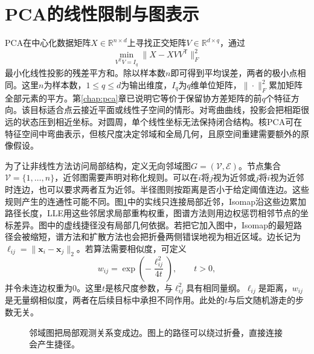 \section{PCA的线性限制与图表示}
PCA在中心化数据矩阵$X\in\mathbb R^{n\times d}$上寻找正交矩阵$V\in\mathbb R^{d\times q}$，通过
\begin{equation}
 \min_{V^{\mathsf T}V=I_q}\|X-XVV^{\mathsf T}\|_F^2
 \label{eq:manifold-pca-baseline}
\end{equation}
最小化线性投影的残差平方和。除以样本数$n$即可得到平均误差，两者的极小点相同。这里$n$为样本数，$1\leq q\leq d$为输出维度，$I_q$为$q$维单位矩阵，$\|\cdot\|_F^2$累加矩阵全部元素的平方。第\ref{chap:pca}章已说明它等价于保留协方差矩阵的前$q$个特征方向。该目标适合点云接近平面或线性子空间的情形。对弯曲曲线，投影会把相距很远的状态压到相近坐标。对圆周，单个线性坐标无法保持闭合结构。核PCA可在特征空间中弯曲表示，但核尺度决定邻域和全局几何，且原空间重建需要额外的原像假设\cite{scholkopf1998kpca}。

为了让非线性方法访问局部结构，定义无向邻域图$G=(\mathcal V,\mathcal E)$。节点集合$\mathcal V=\{1,\ldots,n\}$，近邻图需要声明对称化规则。可以在$i$将$j$视为近邻或$j$将$i$视为近邻时连边，也可以要求两者互为近邻。半径图则按距离是否小于给定阈值连边。这些规则产生的连通性可能不同。图\ref{fig:manifold-neighborhood-graph}中的实线只连接局部近邻，Isomap沿这些边累加路径长度，LLE用这些邻居求局部重构权重，图谱方法则用边权惩罚相邻节点的坐标差异。图中的虚线捷径没有局部几何依据。若把它加入图中，Isomap的最短路径会被缩短，谱方法和扩散方法也会把折叠两侧错误地视为相近区域。边长记为$\ell_{ij}=\|\bm x_i-\bm x_j\|_2$。若算法需要相似度，可定义
\begin{equation}
 w_{ij}=\exp\left(-\frac{\ell_{ij}^2}{4t}\right),\qquad t>0,
 \label{eq:manifold-heat-weight}
\end{equation}
并令未连边权重为$0$。这里$t$是核尺度参数，与$\ell_{ij}^2$具有相同量纲。$\ell_{ij}$是距离，$w_{ij}$是无量纲相似度，两者在后续目标中承担不同作用。此处的$t$与后文随机游走的步数无关。

\begin{figure}[htbp]
\centering
{}
\caption{邻域图把局部观测关系变成边。图上的路径可以绕过折叠，直接连接会产生捷径。}
\label{fig:manifold-neighborhood-graph}
\end{figure}

